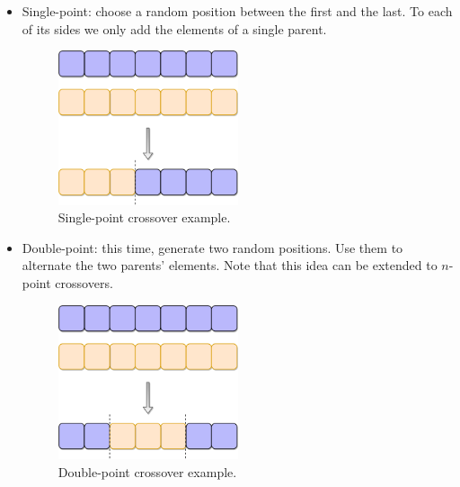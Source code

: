 			\begin{itemize}

				\item
				Single-point: choose a random position between the first and the last. To each of its sides we only add the elements of a single parent.

				\vspace{0.2cm}

			    \begin{figure}[bth]

			        \myfloatalign
			        \includegraphics[width=0.5\textwidth]{gfx/SinglePointCrossover.png}
			        \caption{Single-point crossover example.}

			    \end{figure}

			    \item
			    Double-point: this time, generate two random positions. Use them to alternate the two parents' elements. Note that this idea can be extended to $n$-point crossovers.

			    \vspace{0.2cm}

			    \begin{figure}[bth]

			        \myfloatalign
			        \includegraphics[width=0.5\textwidth]{gfx/DoublePointCrossover.png}
			        \caption{Double-point crossover example.}


\end{figure}
\end{itemize}
